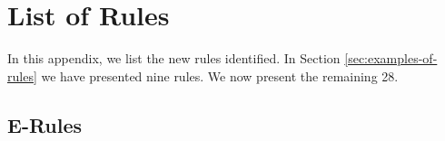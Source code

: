 \chapter{List of Rules}
\label{ap:list-rules}
In this appendix, we list the new rules identified.
In Section \ref{sec:examples-of-rules} we have presented nine rules. 
We now present the remaining 28.

\section{E-Rules}

\\
\\
